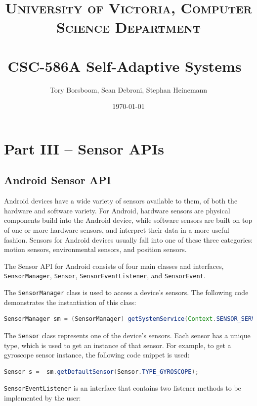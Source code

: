 \documentclass[paper=letter, fontsize=11pt]{scrartcl}
\title{	
\normalfont \normalsize 
\textsc{University of Victoria, Computer Science Department} \\ [25pt]
\horrule{0.5pt} \\[0.4cm]
\huge CSC-586A Self-Adaptive Systems\
\horrule{2pt} \\[0.5cm]
}
\author{Tory Borsboom, Sean Debroni, Stephan Heinemann}
\date{\normalsize\today}
\numberwithin{equation}{section}
\numberwithin{figure}{section}
\numberwithin{table}{section}
\begin{document}
\maketitle 

\section{Part III -- Sensor APIs}
\label{sec:part3}

\subsection{Android Sensor API}
\label{sec:android_sensor_api}
\par
Android devices have a wide variety of sensors available to them, of both the
hardware and software variety. For Android, hardware sensors are physical
components build into the Android device, while software sensors are built on
top of one or more hardware sensors, and interpret their data in a more useful
fashion. Sensors for Android devices usually fall into one of these three
categories: motion sensors, environmental sensors, and position sensors.

\par
The Sensor \ac{API} for Android consists of four main classes and interfaces,
\texttt{SensorManager}, \texttt{Sensor}, \texttt{SensorEventListener}, and
\texttt{SensorEvent}.

\par
The \texttt{SensorManager} class is used to access a device's sensors. The
following code demonstrates the instantiation of this class:

\begin{lstlisting}[basicstyle=\small,language=Java]
SensorManager sm = (SensorManager) getSystemService(Context.SENSOR_SERVICE);
\end{lstlisting}

\par
The \texttt{Sensor} class represents one of the device's sensors. Each sensor
has a unique type, which is used to get an instance of that sensor.
For example, to get a gyroscope sensor instance, the following code snippet
is used:

\begin{lstlisting}[basicstyle=\small,language=Java]
Sensor s =  sm.getDefaultSensor(Sensor.TYPE_GYROSCOPE);
\end{lstlisting}

\par
\texttt{SensorEventListener} is an interface that contains two listener
methods to be implemented by the user:
\end{document}

